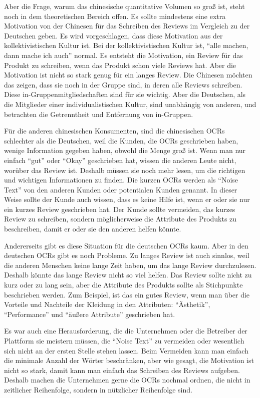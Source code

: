 Aber die Frage, warum das chinesische quantitative Volumen so groß ist, steht noch in dem theoretischen Bereich offen. Es sollte mindestens eine extra Motivation von der Chinesen für das Schreiben des Reviews im Vergleich zu der Deutschen geben. Es wird vorgeschlagen, dass diese Motivation aus der kollektivistischen Kultur ist. Bei der kollektivistischen Kultur ist, ``alle machen, dann mache ich auch'' normal. Es entsteht die Motivation, ein Review für das Produkt zu schreiben, wenn das Produkt schon viele Reviews hat. Aber die Motivation ist nicht so stark genug für ein langes Review. Die Chinesen möchten das zeigen, dass sie noch in der Gruppe sind, in deren alle Reviews schreiben. Diese in-Gruppenmitgliedschaften sind für sie wichtig. Aber die Deutschen, als die Mitglieder einer individualistischen Kultur, sind unabhängig von anderen, und betrachten die Getrenntheit und Entfernung von in-Gruppen. \citep{singelis1994measurement}

Für die anderen chinesischen Konsumenten, sind die chinesischen \ac{OCRs} schlechter als die Deutschen, weil die Kunden, die \ac{OCRs} geschrieben haben, wenige Information gegeben haben, obwohl die Menge groß ist. Wenn man nur einfach ``gut'' oder ``Okay'' geschrieben hat, wissen die anderen Leute nicht, worüber das Review ist. Deshalb müssen sie noch mehr lesen, um die richtigen und wichtigen Informationen zu finden. Die kurzen \ac{OCRs} werden als ``Noise Text'' von den anderen Kunden oder potentialen Kunden genannt. In dieser Weise sollte der Kunde auch wissen, dass es keine Hilfe ist, wenn er oder sie nur ein kurzes Review geschrieben hat. Der Kunde sollte vermeiden, das kurzes Review zu schreiben, sondern möglicherweise die Attribute des Produkts zu beschreiben, damit er oder sie den anderen helfen könnte. 

Andererseits gibt es diese Situation für die deutschen \ac{OCRs} kaum. Aber in den deutschen \ac{OCRs} gibt es noch Probleme. Zu langes Review ist auch sinnlos, weil die anderen Menschen keine lange Zeit haben, um das lange Review durchzulesen. Deshalb könnte das lange Review nicht so viel helfen. Das Review sollte nicht zu kurz oder zu lang sein, aber die Attribute des Produkts sollte als Stichpunkte beschrieben werden. Zum Beispiel, ist das ein gutes Review, wenn man über die Vorteile und Nachteile der Kleidung in den Attributen: ``Ästhetik'', ``Performance'' und ``äußere Attribute'' geschrieben hat.

Es war auch eine Herausforderung, die die Unternehmen oder die Betreiber der Plattform sie meistern müssen, die ``Noise Text'' zu vermeiden oder wesentlich sich nicht an der ersten Stelle stehen lassen. Beim Vermeiden kann man einfach die minimale Anzahl der Wörter beschränken, aber wie gesagt, die Motivation ist nicht so stark, damit kann man einfach das Schreiben des Reviews aufgeben. Deshalb machen die Unternehmen gerne die \ac{OCRs} nochmal ordnen, die nicht in zeitlicher Reihenfolge, sondern in nützlicher Reihenfolge sind. 

